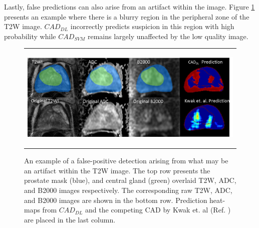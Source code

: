 Lastly, false predictions can also arise from an artifact within the image. Figure \ref{fig:11} presents an example where there is a blurry region in the peripheral zone of the T2W image. $CAD_{DL}$ incorrectly predicts suspicion in this region with high probability while $CAD_{SVM}$ remains largely unaffected by the low quality image.   
\begin{figure} [ht]
   \begin{center}
   \begin{tabular}{c}
   \includegraphics[height=5cm]{Figure11}
   \end{tabular}
   \end{center}
   \caption[Fig11]
   { \label{fig:11} 
An example of a false-positive detection arising from what may be an artifact within the T2W image. The top row presents the prostate mask (blue), and central gland (green) overlaid T2W, ADC, and B2000 images respectively. The corresponding raw T2W, ADC, and B2000 images are shown in the bottom row. Prediction heat-maps from $CAD_{DL}$ and the competing CAD by Kwak et. al (Ref. ) are placed in the last column.}
   \end{figure}

